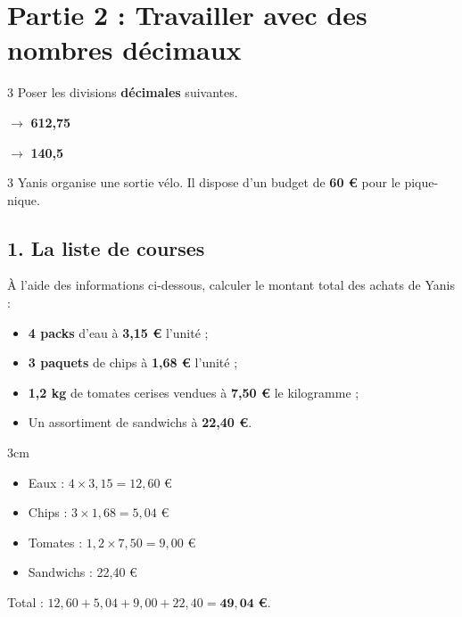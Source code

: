\documentclass[a4paper]{book}
\begin{document}
{\section*{Partie 2 : Travailler avec des nombres décimaux}

    \begin{exerciceNote}{3}
        Poser les divisions \textbf{décimales} suivantes.
        
        \begin{minipage}{0.45\linewidth}
            \quad {} \quad $\rightarrow$ \textbf{612,75}
        \end{minipage}
        \hfill\vline\hfill
        \begin{minipage}{0.45\linewidth}
            \quad {} \quad $\rightarrow$ \textbf{140,5}
        \end{minipage}        
    \end{exerciceNote}


    \begin{exerciceNote}{3}
        Yanis organise une sortie vélo. Il dispose d'un budget de \textbf{60 €} pour le pique-nique.

        \subsection*{1. La liste de courses}
        À l'aide des informations ci-dessous, calculer le montant total des achats de Yanis :
        \begin{itemize}
            \item \textbf{4 packs} d'eau à \textbf{3,15 €} l'unité ;
            \item \textbf{3 paquets} de chips à \textbf{1,68 €} l'unité ;
            \item \textbf{1,2 kg} de tomates cerises vendues à \textbf{7,50 €} le kilogramme ;
            \item Un assortiment de sandwichs à \textbf{22,40 €}.
        \end{itemize}
        
        \begin{ZoneReponse}{3cm}
            \begin{itemize}
                \item Eaux : $4 \times 3,15 = 12,60$ \euro
                \item Chips : $3 \times 1,68 = 5,04$ \euro
                \item Tomates : $1,2 \times 7,50 = 9,00$ \euro
                \item Sandwichs : 22,40 \euro
            \end{itemize}
            Total : $12,60 + 5,04 + 9,00 + 22,40 = \mathbf{49,04}$ \textbf{\euro}.
        \end{ZoneReponse}
        

\end{exerciceNote}}
\end{document}
